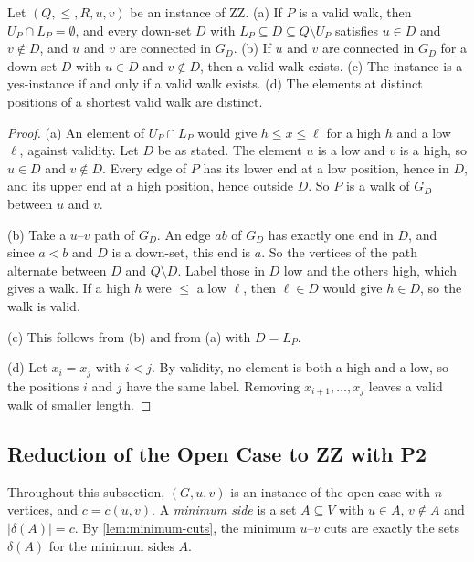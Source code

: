 \documentclass[pdflatex,sn-mathphys-num]{sn-jnl}%
\theoremstyle{thmstyleone}%
\theoremstyle{thmstyletwo}%
\theoremstyle{thmstylethree}%
\begin{document}
\begin{lemma}
\label{lem:zz-valid}
Let $(Q, \leq, R, u, v)$ be an instance of ZZ.
(a) If $P$ is a valid walk, then $U_P \cap L_P = \emptyset$, and every down-set $D$ with $L_P \subseteq D \subseteq Q \setminus U_P$ satisfies $u \in D$ and $v \notin D$, and $u$ and $v$ are connected in $G_D$.
(b) If $u$ and $v$ are connected in $G_D$ for a down-set $D$ with $u \in D$ and $v \notin D$, then a valid walk exists.
(c) The instance is a yes-instance if and only if a valid walk exists.
(d) The elements at distinct positions of a shortest valid walk are distinct.
\end{lemma}

\begin{proof}
(a) An element of $U_P \cap L_P$ would give $h \leq x \leq \ell$ for a high $h$ and a low $\ell$, against validity.
Let $D$ be as stated.
The element $u$ is a low and $v$ is a high, so $u \in D$ and $v \notin D$.
Every edge of $P$ has its lower end at a low position, hence in $D$, and its upper end at a high position, hence outside $D$.
So $P$ is a walk of $G_D$ between $u$ and $v$.

(b) Take a $u$--$v$ path of $G_D$.
An edge $ab$ of $G_D$ has exactly one end in $D$, and since $a < b$ and $D$ is a down-set, this end is $a$.
So the vertices of the path alternate between $D$ and $Q \setminus D$.
Label those in $D$ low and the others high, which gives a walk.
If a high $h$ were $\leq$ a low $\ell$, then $\ell \in D$ would give $h \in D$, so the walk is valid.

(c) This follows from (b) and from (a) with $D = L_P$.

(d) Let $x_i = x_j$ with $i < j$.
By validity, no element is both a high and a low, so the positions $i$ and $j$ have the same label.
Removing $x_{i+1}, \dots, x_j$ leaves a valid walk of smaller length.
\end{proof}

\subsection{Reduction of the Open Case to ZZ with P2}
\label{sec:zz-reduction}

Throughout this subsection, $(G, u, v)$ is an instance of the open case with $n$ vertices, and $c = c(u, v)$.
A \emph{minimum side} is a set $A \subseteq V$ with $u \in A$, $v \notin A$ and $|\delta(A)| = c$.
By \cref{lem:minimum-cuts}, the minimum $u$--$v$ cuts are exactly the sets $\delta(A)$ for the minimum sides $A$.
\end{document}
